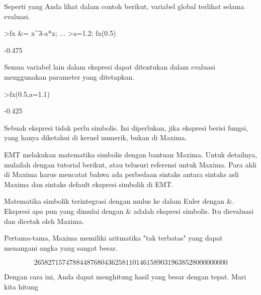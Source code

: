\documentclass[a4paper,10pt]{article}
\begin{document}
\begin{eulernotebook}
\begin{eulercomment}
\begin{eulercomment}
\begin{eulercomment}
Seperti yang Anda lihat dalam contoh berikut, variabel global terlihat
selama evaluasi.
\end{eulercomment}
\begin{eulerprompt}
>fx &= x^3-a*x;  ...
>a=1.2; fx(0.5)
\end{eulerprompt}
\begin{euleroutput}
  -0.475
\end{euleroutput}
\begin{eulercomment}
Semua variabel lain dalam ekspresi dapat ditentukan dalam evaluasi
menggunakan parameter yang ditetapkan.
\end{eulercomment}
\begin{eulerprompt}
>fx(0.5,a=1.1)
\end{eulerprompt}
\begin{euleroutput}
  -0.425
\end{euleroutput}
\begin{eulercomment}
Sebuah ekspresi tidak perlu simbolis. Ini diperlukan, jika ekspresi
berisi fungsi, yang hanya diketahui di kernel numerik, bukan di
Maxima.

\begin{eulercomment}
\begin{eulercomment}
EMT melakukan matematika simbolis dengan bantuan Maxima. Untuk
detailnya, mulailah dengan tutorial berikut, atau telusuri referensi
untuk Maxima. Para ahli di Maxima harus mencatat bahwa ada perbedaan
sintaks antara sintaks asli Maxima dan sintaks default ekspresi
simbolik di EMT.

Matematika simbolik terintegrasi dengan mulus ke dalam Euler dengan \&.
Ekspresi apa pun yang dimulai dengan \& adalah ekspresi simbolis. Itu
dievaluasi dan dicetak oleh Maxima.

Pertama-tama, Maxima memiliki aritmatika "tak terbatas" yang dapat
menangani angka yang sangat besar.
\end{eulercomment}
\begin{eulerformula}
\[
2658271574788448768043625811014615890319638528000000000
\]
\end{eulerformula}
\begin{eulercomment}
Dengan cara ini, Anda dapat menghitung hasil yang besar dengan tepat.
Mari kita hitung


\end{eulercomment}
\end{eulercomment}
\end{eulercomment}
\end{eulercomment}
\end{eulercomment}
\end{eulernotebook}
\end{document}
